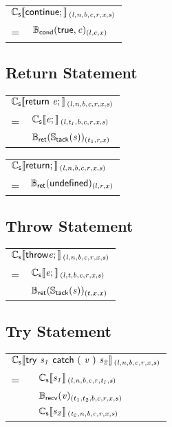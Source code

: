 \documentclass[a4j]{jsarticle}
\newcommand{\lb}{[\![}				%
\newcommand{\rb}{]\!]}				%
\newcommand{\db}[1]{\lb#1\rb}			%
\newcommand{\den}[2]{{#1}\db{#2}\,}
\newcommand{\defC}[3]{\den{#1}{\sf #2}_{\it #3}}
\newcommand{\Cs}{\defC{\mathbb{C}_{\sf s}}}
\newcommand{\Stack}[1]{\mathbb{S}_{\sf tack}(#1)}
\newcommand{\defB}[3]{{#1}({\sf #2})_{#3}}
\newcommand{\Bcond}{\defB{\mathbb{B}_{\sf cond}}}
\newcommand{\Brecv}{\defB{\mathbb{B}_{\sf recv}}}
\newcommand{\Bret}{\defB{\mathbb{B}_{\sf ret}}}
\newcommand{\var}[1]{{\it #1}}
\begin{document}
\begin{tabular}{ll}
\multicolumn{2}{l}{
	$ \Cs{ continue; }{(l, n, b, c, r, x, s)} $
}  \\
=  &  $ \Bcond{ true, \var{c} }{(l, c, x)}    $
\end{tabular}



\subsection{Return Statement}

\begin{tabular}{ll}
\multicolumn{2}{l}{
	$ \Cs{ return\ \var{e}; }{(l, n, b, c, r, x, s)} $
}  \\
=  &  $ \Cs{ \var{e}; }{(l, t_1, b, c, r, x, s)} $ \\
   &  $ \Bret{ \Stack{\var{s}} }{(t_1, r, x)}    $
\end{tabular}

\vspace{1em}

\begin{tabular}{ll}
\multicolumn{2}{l}{
	$ \Cs{ return; }{(l, n, b, c, r, x, s)} $
}  \\
=  &  $ \Bret{ undefined }{(l, r, x)}    $
\end{tabular}



\subsection{Throw Statement}

\begin{tabular}{ll}
\multicolumn{2}{l}{
	$ \Cs{ throw \var{e}; }{(l, n, b, c, r, x, s)} $
}  \\
=  &  $ \Cs{ \var{e}; }{(l, t, b, c, r, x, s)} $ \\
   &  $ \Bret{ \Stack{\var{s}} }{(t, x, x)}    $
\end{tabular}



\subsection{Try Statement}

\begin{tabular}{ll}
\multicolumn{2}{l}{
	$ \Cs{ try\ \var{s_1}\ catch\ (\ \var{v}\ )\ \var{s_2} }{(l, n, b, c, r, x, s)} $
}  \\
=  &  $ \Cs{ \var{s_1} }{(l, n, b, c, r, t_1, s)} $ \\
   &  $ \Brecv{ \var{v} }{(t_1, t_2, b, c, r, x, s)} $ \\
   &  $ \Cs{ \var{s_2} }{(t_2, n, b, c, r, x, s)} $
\end{tabular}
\end{document}
